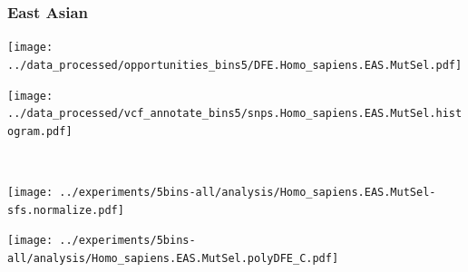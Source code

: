 \subsubsection{East Asian}

\begin{minipage}{0.49\linewidth}
    \texttt{[image: ../data\_processed/opportunities\_bins5/DFE.Homo\_sapiens.EAS.MutSel.pdf]}
\end{minipage}
\begin{minipage}{0.49\linewidth}
    \texttt{[image: ../data\_processed/vcf\_annotate\_bins5/snps.Homo\_sapiens.EAS.MutSel.histogram.pdf]}
\end{minipage}
\\
\begin{minipage}{0.49\linewidth}
    \texttt{[image: ../experiments/5bins-all/analysis/Homo\_sapiens.EAS.MutSel-sfs.normalize.pdf]}
\end{minipage}
\begin{minipage}{0.4\linewidth}
    \texttt{[image: ../experiments/5bins-all/analysis/Homo\_sapiens.EAS.MutSel.polyDFE\_C.pdf]}
\end{minipage}
